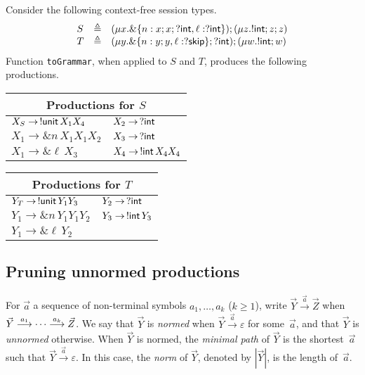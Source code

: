 \begin{example}
\label{ex:productions}
Consider the following context-free session types.
%
\begin{equation*}
\begin{array}{lll}
    S & \triangleq & (\mu x . \&\{n: x;x;?\intk, \ell: ?\intk\});(\mu z . !\intk ; z;z)\\
    T & \triangleq & (\mu y . \&\{n: y;y, \ell: ?\skipk\};?\intk);(\mu w. !\intk ; w)
\end{array}
\end{equation*}
%
Function \lstinline{toGrammar}, when applied to $S$ and $T$, produces
the following productions.
\begin{center}
  \begin{tabular}{l l}
    \multicolumn{2}{c}{Productions for $S$}\\ \hline
    $X_S \rightarrow \,\initialProd\, X_1 X_4$ &$X_2 \rightarrow \,? \intk$\\
    $X_1 \rightarrow \& n\, X_1 X_1 X_2$&$X_3 \rightarrow \,? \intk$\\
    $X_1 \rightarrow \& \ell\, X_3$ &$X_4 \rightarrow \,!\intk\, X_4 X_4$\\
  \end{tabular} \qquad
  \begin{tabular}{l l}
    \multicolumn{2}{c}{Productions for $T$}\\ \hline
    $Y_T \rightarrow \,\initialProd\, Y_1 Y_3 $&$Y_2 \rightarrow \,? \intk$\\
    $Y_1 \rightarrow \& n\, Y_1 Y_1 Y_2 $&$Y_3 \rightarrow \,!\intk\, Y_3$\\
    $Y_1 \rightarrow \& \ell \,Y_2 $ &
  \end{tabular}
\end{center}
\end{example}

\subsection{Pruning unnormed productions}
\label{subsec:prune}

For $\vec a$ a sequence of non-terminal symbols $a_1,\ldots, a_k$
($k\ge1$), write $\vec Y \xrightarrow{\vec a} \vec Z$ when
$\vec Y \LTSderives[a_1] \cdots \LTSderives[a_k] \vec Z$.
%
We say that $\vec Y$ is \emph{normed} when
$\vec Y \xrightarrow{\vec a} \varepsilon$ for some~$\vec a$, and that
$\vec Y$ is \emph{unnormed} otherwise.
%
When $\vec Y$ is normed, the \emph{minimal path} of $\vec Y$ is the
shortest~$\vec a$ such that $\vec Y \xrightarrow{\vec a}
\varepsilon$.
%
In this case, the \emph{norm} of $\vec Y$, denoted by $|\vec Y|$, is
the length of~$\vec a$.

